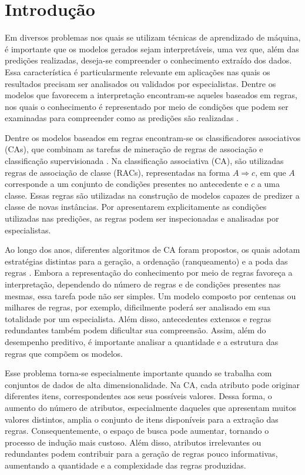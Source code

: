 \chapter{Introdução}\label{intro}

Em diversos problemas nos quais se utilizam técnicas de aprendizado de máquina, é importante que os modelos gerados sejam interpretáveis, uma vez que, além das predições realizadas, deseja-se compreender o conhecimento extraído dos dados. Essa característica é particularmente relevante em aplicações nas quais os resultados precisam ser analisados ou validados por especialistas. Dentre os modelos que favorecem a interpretação encontram-se aqueles baseados em regras, nos quais o conhecimento é representado por meio de condições que podem ser examinadas para compreender como as predições são realizadas \cite{Rudin2019,margot2021interpretability,molnar2022}.

Dentre os modelos baseados em regras encontram-se os classificadores associativos (CAs), que combinam as tarefas de mineração de regras de associação e classificação supervisionada \cite{liu1998}. Na classificação associativa (CA), são utilizadas regras de associação de classe (RACs), representadas na forma $A \Rightarrow c$, em que $A$ corresponde a um conjunto de condições presentes no antecedente e $c$ a uma classe. Essas regras são utilizadas na construção de modelos capazes de predizer a classe de novas instâncias. Por apresentarem explicitamente as condições utilizadas nas predições, as regras podem ser inspecionadas e analisadas por especialistas.

Ao longo dos anos, diferentes algoritmos de CA foram propostos, os quais adotam estratégias distintas para a geração, a ordenação (ranqueamento) e a poda das regras \cite{10.1016/j.eswa.2025.127454}. Embora a representação do conhecimento por meio de regras favoreça a interpretação, dependendo do número de regras e de condições presentes nas mesmas, essa tarefa pode não ser simples. Um modelo composto por centenas ou milhares de regras, por exemplo, dificilmente poderá ser analisado em sua totalidade por um especialista. Além disso, antecedentes extensos e regras redundantes também podem dificultar sua compreensão. Assim, além do desempenho preditivo, é importante analisar a quantidade e a estrutura das regras que compõem os modelos.

Esse problema torna-se especialmente importante quando se trabalha com conjuntos de dados de alta dimensionalidade. Na CA, cada atributo pode originar diferentes itens, correspondentes aos seus possíveis valores. Dessa forma, o aumento do número de atributos, especialmente daqueles que apresentam muitos valores distintos, amplia o conjunto de itens disponíveis para a extração das regras. Consequentemente, o espaço de busca pode aumentar, tornando o processo de indução mais custoso. Além disso, atributos irrelevantes ou redundantes podem contribuir para a geração de regras pouco informativas, aumentando a quantidade e a complexidade das regras produzidas.

